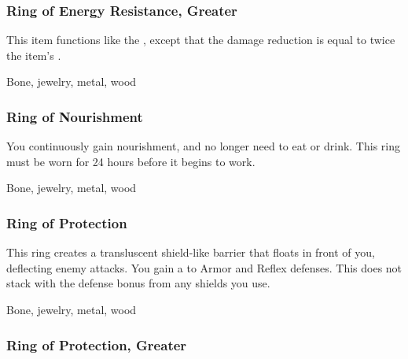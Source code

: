\lowercase{\hypertarget{item:Ring of Energy Resistance, Greater}{}}\label{item:Ring of Energy Resistance, Greater}
\hypertarget{item:Ring of Energy Resistance, Greater}{\subsubsection{Ring of Energy Resistance, Greater\hfill{}}}

This item functions like the , except that the damage reduction is equal to twice the item's .



 


 Bone, jewelry, metal, wood


\lowercase{\hypertarget{item:Ring of Nourishment}{}}\label{item:Ring of Nourishment}
\hypertarget{item:Ring of Nourishment}{\subsubsection{Ring of Nourishment\hfill{}}}

You continuously gain nourishment, and no longer need to eat or drink.
This ring must be worn for 24 hours before it begins to work.



 


 Bone, jewelry, metal, wood


\lowercase{\hypertarget{item:Ring of Protection}{}}\label{item:Ring of Protection}
\hypertarget{item:Ring of Protection}{\subsubsection{Ring of Protection\hfill{}}}

This ring creates a transluscent shield-like barrier that floats in front of you, deflecting enemy attacks.
You gain a   to Armor and Reflex defenses.
This does not stack with the defense bonus from any shields you use.



 


 Bone, jewelry, metal, wood


\lowercase{\hypertarget{item:Ring of Protection, Greater}{}}\label{item:Ring of Protection, Greater}
\hypertarget{item:Ring of Protection, Greater}{\subsubsection{Ring of Protection, Greater\hfill{}}}

